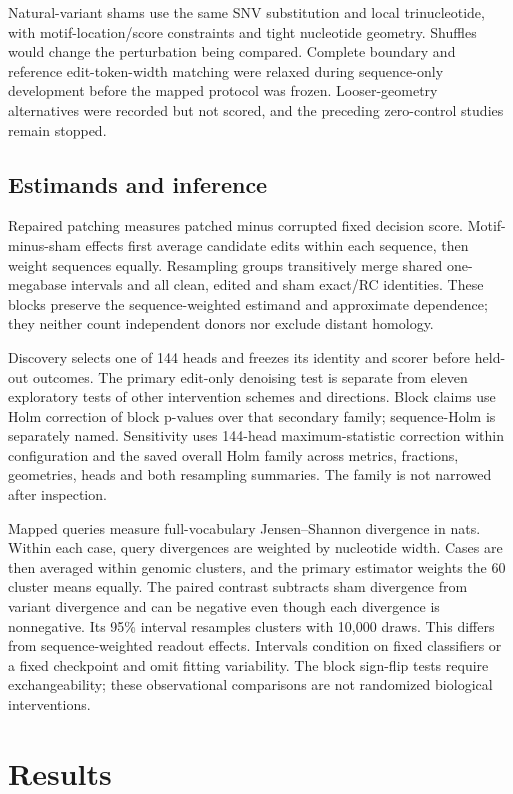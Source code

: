 \documentclass[10pt,letterpaper]{article}
\begin{document}
Natural-variant shams use the same SNV substitution and local trinucleotide, with motif-location/score constraints and tight nucleotide geometry. Shuffles would change the perturbation being compared. Complete boundary and reference edit-token-width matching were relaxed during sequence-only development before the mapped protocol was frozen. Looser-geometry alternatives were recorded but not scored, and the preceding zero-control studies remain stopped.
\subsection{Estimands and inference}
Repaired patching measures patched minus corrupted fixed decision score. Motif-minus-sham effects first average candidate edits within each sequence, then weight sequences equally. Resampling groups transitively merge shared one-megabase intervals and all clean, edited and sham exact/RC identities. These blocks preserve the sequence-weighted estimand and approximate dependence; they neither count independent donors nor exclude distant homology.

Discovery selects one of 144 heads and freezes its identity and scorer before held-out outcomes. The primary edit-only denoising test is separate from eleven exploratory tests of other intervention schemes and directions. Block claims use Holm correction of block p-values over that secondary family; sequence-Holm is separately named. Sensitivity uses 144-head maximum-statistic correction within configuration and the saved overall Holm family across metrics, fractions, geometries, heads and both resampling summaries. The family is not narrowed after inspection.

Mapped queries measure full-vocabulary Jensen--Shannon divergence in nats. Within each case, query divergences are weighted by nucleotide width. Cases are then averaged within genomic clusters, and the primary estimator weights the 60 cluster means equally. The paired contrast subtracts sham divergence from variant divergence and can be negative even though each divergence is nonnegative. Its 95\% interval resamples clusters with 10,000 draws. This differs from sequence-weighted readout effects. Intervals condition on fixed classifiers or a fixed checkpoint and omit fitting variability. The block sign-flip tests require exchangeability; these observational comparisons are not randomized biological interventions.
\section{Results}
\end{document}
